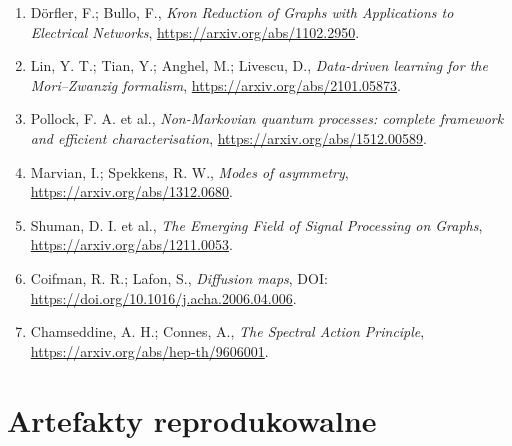 \documentclass[11pt,a4paper,openany]{report}
\begin{document}
\begin{enumerate}
\item 
Dörfler, F.; Bullo, F., \emph{Kron Reduction of Graphs with Applications to Electrical Networks}, \href{https://arxiv.org/abs/1102.2950}{https:/\allowbreak{}/\allowbreak{}arxiv.org/\allowbreak{}abs/\allowbreak{}1102.2950}.

\item 
Lin, Y. T.; Tian, Y.; Anghel, M.; Livescu, D., \emph{Data-driven learning for the Mori--Zwanzig formalism}, \href{https://arxiv.org/abs/2101.05873}{https:/\allowbreak{}/\allowbreak{}arxiv.org/\allowbreak{}abs/\allowbreak{}2101.05873}.

\item 
Pollock, F. A. et al., \emph{Non-Markovian quantum processes: complete framework and efficient characterisation}, \href{https://arxiv.org/abs/1512.00589}{https:/\allowbreak{}/\allowbreak{}arxiv.org/\allowbreak{}abs/\allowbreak{}1512.00589}.

\item 
Marvian, I.; Spekkens, R. W., \emph{Modes of asymmetry}, \href{https://arxiv.org/abs/1312.0680}{https:/\allowbreak{}/\allowbreak{}arxiv.org/\allowbreak{}abs/\allowbreak{}1312.0680}.

\item 
Shuman, D. I. et al., \emph{The Emerging Field of Signal Processing on Graphs}, \href{https://arxiv.org/abs/1211.0053}{https:/\allowbreak{}/\allowbreak{}arxiv.org/\allowbreak{}abs/\allowbreak{}1211.0053}.

\item 
Coifman, R. R.; Lafon, S., \emph{Diffusion maps}, DOI: \href{https://doi.org/10.1016/j.acha.2006.04.006}{https:/\allowbreak{}/\allowbreak{}doi.org/\allowbreak{}10.1016/\allowbreak{}j.acha.2006.04.006}.

\item 
Chamseddine, A. H.; Connes, A., \emph{The Spectral Action Principle}, \href{https://arxiv.org/abs/hep-th/9606001}{https:/\allowbreak{}/\allowbreak{}arxiv.org/\allowbreak{}abs/\allowbreak{}hep-th/\allowbreak{}9606001}.

\end{enumerate}

\chapter{Artefakty reprodukowalne}
\end{document}
